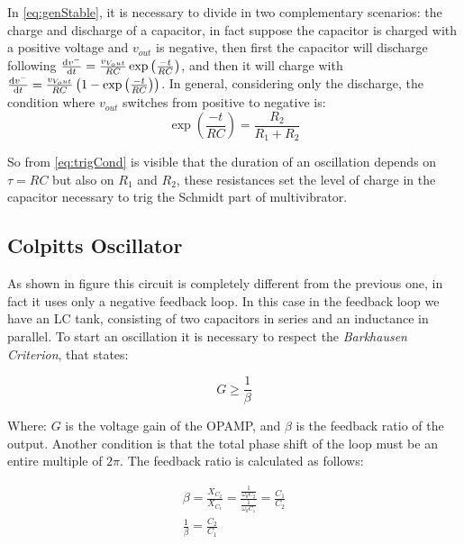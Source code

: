 \documentclass[a4paper, twocolumn]{article}
\begin{document}
In \eqref{eq:genStable}, it is necessary to divide in two complementary scenarios: the charge and discharge of a capacitor, in fact suppose the capacitor is charged with a positive voltage and \(v_{out}\) is negative, then first the capacitor will discharge following \(\dv{v^-}{t}= \frac{v_{V_out}}{RC}\exp\left(\frac{-t}{RC}\right)\), and then it will charge with \(\dv{v^-}{t}= \frac{v_{V_out}}{RC}\left(1-\exp\left(\frac{-t}{RC}\right)\right)\). In general, considering only the discharge, the condition where \(v_{out}\) switches from positive to negative is:
\begin{equation}
    \label{eq:trigCond}
    \exp\left(\frac{-t}{RC}\right) = \frac{R_2}{R_1+R_2}
\end{equation}

So from \eqref{eq:trigCond} is visible that the duration of an oscillation depends on \(\tau = RC\) but also on \(R_1\) and \(R_2\), these resistances set the level of charge in the capacitor necessary to trig the Schmidt part of multivibrator.

\subsection{Colpitts Oscillator}

\begin{center}
    \centering
    \def \svgwidth{.95\columnwidth}
    
\end{center}

As shown in figure this circuit is completely different from the previous one, in fact it uses only a negative feedback loop. In this case in the feedback loop we have an LC tank, consisting of two capacitors in series and an inductance in parallel. To start an oscillation it is necessary to respect the \emph{Barkhausen Criterion}, that states:

\begin{equation}
    G \ge \frac{1}{\beta}
\end{equation}

Where: \(G\) is the voltage gain of the OPAMP, and $\beta$ is the feedback ratio of the output. Another condition is that the total phase shift of the loop must be an entire multiple of \(2\pi\). 
The feedback ratio is calculated as follows: 

\begin{gather}
        \beta  = \frac{X_{C_2}}{X_{C_1}} = \frac{\frac{1}{\omega_0 C_2}}{\frac{1}{\omega_0 C_1}} = \frac{C_1}{C_2}\\
    \frac{1}{\beta}= \frac{C_2}{C_1}
\end{gather}
\end{document}

